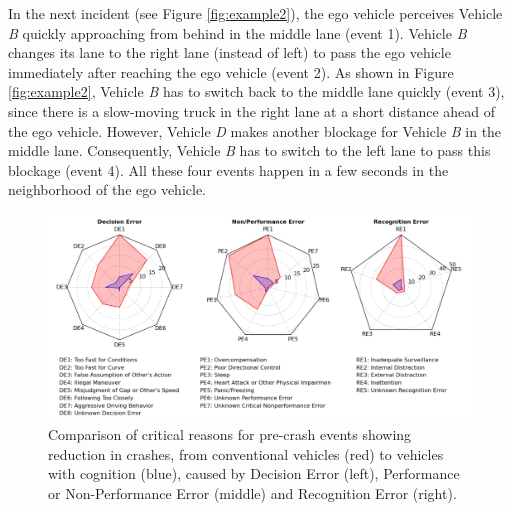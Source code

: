 \documentclass[journal, 11pt]{IEEEtran}
\begin{document}
In the next incident (see Figure \ref{fig:example2}), the ego vehicle perceives
Vehicle \textit{B} quickly approaching from behind in the middle lane (event 1).
Vehicle \textit{B} changes its lane to the right lane (instead of left) to pass
the ego vehicle immediately after reaching the ego vehicle (event 2). As
shown in Figure \ref{fig:example2}, Vehicle \textit{B} has to switch back to the
middle lane quickly (event 3), since there is a slow-moving truck in the right
lane at a short distance ahead of the ego vehicle. However, Vehicle \textit{D}
makes another blockage for Vehicle \textit{B} in the middle lane. Consequently,
Vehicle \textit{B} has to switch to the left lane to pass this blockage (event
4). All these four events happen in a few seconds in the neighborhood of the ego
vehicle.

\begin{figure}
  \centering
  \includegraphics[width=\textwidth]{figs/CrashCriticalReasons.pdf}
  \caption{{\fontsize{10}{10}\selectfont Comparison of critical reasons for
  pre-crash events showing reduction in crashes, from conventional vehicles
  \cite{nhtsa:crash-causation} (red) to vehicles with cognition (blue),
  caused by Decision Error (left), Performance or Non-Performance Error
  (middle) and Recognition Error (right).}}
  \label{fig:errorPlot}
  \vspace*{-6mm}
\end{figure}
\end{document}
